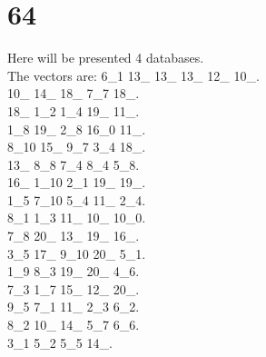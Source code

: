 \chapter{64}
\indent Here will be presented 4 databases.\\
The vectors are:
6\_1 13\_ 13\_ 13\_ 12\_ 10\_.\\10\_ 14\_ 18\_ 7\_7 18\_.\\18\_ 1\_2 1\_4 19\_ 11\_.\\1\_8 19\_ 2\_8 16\_0 11\_.\\8\_10 15\_ 9\_7 3\_4 18\_.\\13\_ 8\_8 7\_4 8\_4 5\_8.\\16\_ 1\_10 2\_1 19\_ 19\_.\\1\_5 7\_10 5\_4 11\_ 2\_4.\\8\_1 1\_3 11\_ 10\_ 10\_0.\\7\_8 20\_ 13\_ 19\_ 16\_.\\3\_5 17\_ 9\_10 20\_ 5\_1.\\1\_9 8\_3 19\_ 20\_ 4\_6.\\7\_3 1\_7 15\_ 12\_ 20\_.\\9\_5 7\_1 11\_ 2\_3 6\_2.\\8\_2 10\_ 14\_ 5\_7 6\_6.\\3\_1 5\_2 5\_5 14\_.\\